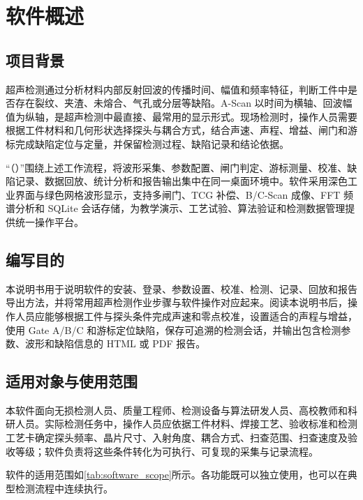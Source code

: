%
%
\section{软件概述}

\subsection{项目背景}
\par
超声检测通过分析材料内部反射回波的传播时间、幅值和频率特征，判断工件中是否存在裂纹、夹渣、未熔合、气孔或分层等缺陷。A-Scan 以时间为横轴、回波幅值为纵轴，是超声检测中最直接、最常用的显示形式。现场检测时，操作人员需要根据工件材料和几何形状选择探头与耦合方式，结合声速、声程、增益、闸门和游标完成缺陷定位与定量，并保留检测过程、缺陷记录和结论依据。
\par
“\SoftwareName（\Version）”围绕上述工作流程，将波形采集、参数配置、闸门判定、游标测量、校准、缺陷记录、数据回放、统计分析和报告输出集中在同一桌面环境中。软件采用深色工业界面与绿色网格波形显示，支持多闸门、TCG 补偿、B/C-Scan 成像、FFT 频谱分析和 SQLite 会话存储，为教学演示、工艺试验、算法验证和检测数据管理提供统一操作平台。

\subsection{编写目的}
\par
本说明书用于说明软件的安装、登录、参数设置、校准、检测、记录、回放和报告导出方法，并将常用超声检测作业步骤与软件操作对应起来。阅读本说明书后，操作人员应能够根据工件与探头条件完成声速和零点校准，设置适合的声程与增益，使用 Gate A/B/C 和游标定位缺陷，保存可追溯的检测会话，并输出包含检测参数、波形和缺陷信息的 HTML 或 PDF 报告。

\subsection{适用对象与使用范围}
\par
本软件面向无损检测人员、质量工程师、检测设备与算法研发人员、高校教师和科研人员。实际检测任务中，操作人员应依据工件材料、焊接工艺、验收标准和检测工艺卡确定探头频率、晶片尺寸、入射角度、耦合方式、扫查范围、扫查速度及验收等级；软件负责将这些条件转化为可执行、可复现的采集与记录流程。
\par
软件的适用范围如\cref{tab:software_scope}所示。各功能既可以独立使用，也可以在典型检测流程中连续执行。

